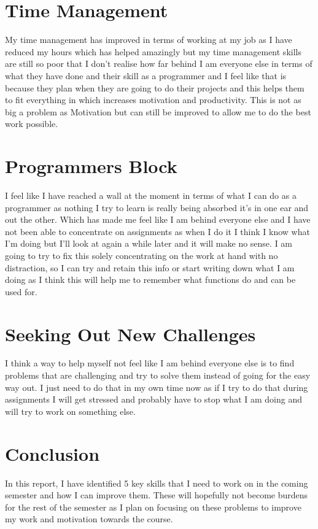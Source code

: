\documentclass[11pt]{scrartcl}
\begin{document}
\section {Time Management}
My time management has improved in terms of working at my job as I have reduced my hours which has helped amazingly but my time management skills are still so poor that I don't realise how far behind I am everyone else in terms of what they have done and their skill as a programmer and I feel like that is because they plan when they are going to do their projects and this helps them to fit everything in which increases motivation and productivity. This is not as big a problem as Motivation but can still be improved to allow me to do the best work possible.

\section {Programmers Block}
I feel like I have reached a wall at the moment in terms of what I can do as a programmer as nothing I try to learn is really being absorbed it's in one ear and out the other. Which has made me feel like I am behind everyone else and I have not been able to concentrate on assignments as when I do it I think I know what I’m doing but I’ll look at again a while later and it will make no sense. I am going to try to fix this solely concentrating on the work at hand with no distraction, so I can try and retain this info or start writing down what I am doing as I think this will help me to remember what functions do and can be used for.

\section {Seeking Out New Challenges}
I think a way to help myself not feel like I am behind everyone else is to find problems that are challenging and try to solve them instead of going for the easy way out. I just need to do that in my own time now as if I try to do that during assignments I will get stressed and probably have to stop what I am doing and will try to work on something else.

\section*{Conclusion}
In this report, I have identified 5 key skills that I need to work on in the coming semester and how I can improve them. These will hopefully not become burdens for the rest of the semester as I plan on focusing on these problems to improve my work and motivation towards the course.





\end{document}
